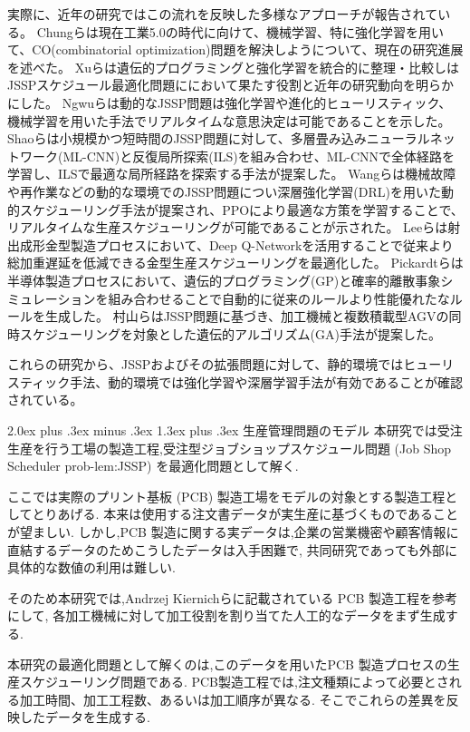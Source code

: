 \documentclass{jarticle}
\makeatletter
\renewcommand{\section}{%
  \@startsection{section}{1}{\z@}%
  {2.0ex plus .3ex minus .3ex}%
  {1.3ex plus .3ex}%
  {\huge\bfseries}%
}
\makeatother
\begin{document}
実際に、近年の研究ではこの流れを反映した多様なアプローチが報告されている。
Chungら\cite{ref1}は現在工業5.0の時代に向けて、機械学習、特に強化学習を用いて、CO(combinatorial optimization)問題を解決しようについて、現在の研究進展を述べた。
Xuら\cite{ref2}は遺伝的プログラミングと強化学習を統合的に整理・比較しはJSSPスケジュール最適化問題ににおいて果たす役割と近年の研究動向を明らかにした。
Ngwuら\cite{ref3}は動的なJSSP問題は強化学習や進化的ヒューリスティック、機械学習を用いた手法でリアルタイムな意思決定は可能であることを示した。
Shaoら\cite{ref4}は小規模かつ短時間のJSSP問題に対して、多層畳み込みニューラルネットワーク(ML-CNN)と反復局所探索(ILS)を組み合わせ、ML-CNNで全体経路を学習し、ILSで最適な局所経路を探索する手法が提案した。
Wangら\cite{ref5}は機械故障や再作業などの動的な環境でのJSSP問題につい深層強化学習(DRL)を用いた動的スケジューリング手法が提案され、PPOにより最適な方策を学習することで、リアルタイムな生産スケジューリングが可能であることが示された。
Leeら\cite{ref6}は射出成形金型製造プロセスにおいて、Deep Q-Networkを活用することで従来より総加重遅延を低減できる金型生産スケジューリングを最適化した。
Pickardtら\cite{ref7}は半導体製造プロセスにおいて、遺伝的プログラミング(GP)と確率的離散事象シミュレーションを組み合わせることで自動的に従来のルールより性能優れたなルールを生成した。
村山ら\cite{ref8}はJSSP問題に基づき、加工機械と複数積載型AGVの同時スケジューリングを対象とした遺伝的アルゴリズム(GA)手法が提案した。

これらの研究から、JSSPおよびその拡張問題に対して、静的環境ではヒューリスティック手法、動的環境では強化学習や深層学習手法が有効であることが確認されている。
\clearpage

\section{生産管理問題のモデル}
本研究では受注生産を行う工場の製造工程,受注型ジョブショップスケジュール問題 (Job Shop Scheduler prob-lem:JSSP) を最適化問題として解く.

ここでは実際のプリント基板 (PCB) 製造工場をモデルの対象とする製造工程としてとりあげる.
本来は使用する注文書データが実生産に基づくものであることが望ましい.
しかし,PCB 製造に関する実データは,企業の営業機密や顧客情報に直結するデータのためこうしたデータは入手困難で,
共同研究であっても外部に具体的な数値の利用は難しい.

そのため本研究では,Andrzej Kiernichら\cite{ref22}に記載されている PCB 製造工程を参考にして,
各加工機械に対して加工役割を割り当てた人工的なデータをまず生成する.

本研究の最適化問題として解くのは,このデータを用いたPCB 製造プロセスの生産スケジューリング問題である.
PCB製造工程では,注文種類によって必要とされる加工時間、加工工程数、あるいは加工順序が異なる.
そこでこれらの差異を反映したデータを生成する.
\end{document}
